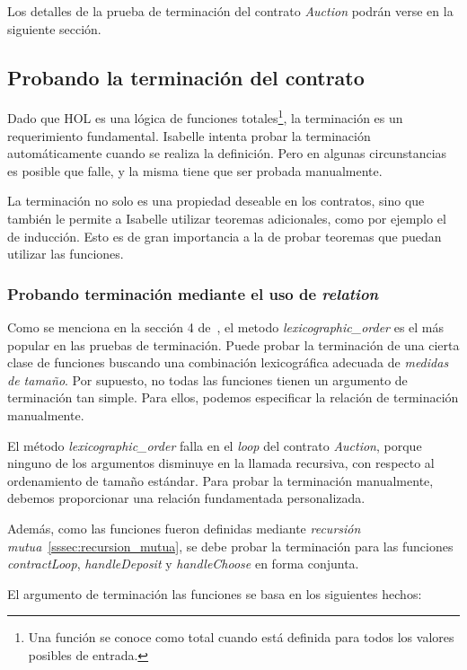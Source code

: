 \documentclass[12pt]{book}
\begin{document}
Los detalles de la prueba de terminación del contrato \textit{Auction} podrán verse en la siguiente sección.


\subsection{Probando la terminación del contrato}

Dado que HOL es una lógica de funciones totales\footnote{Una función se conoce como total cuando está definida para todos los valores posibles de entrada.}, la terminación es un requerimiento fundamental. Isabelle intenta probar la terminación automáticamente cuando se realiza la definición. Pero en algunas circunstancias es posible que falle, y la misma tiene que ser probada manualmente.

La terminación no solo es una propiedad deseable en los contratos, sino que también le permite a Isabelle utilizar teoremas adicionales, como por ejemplo el de inducción. Esto es de gran importancia a la de probar teoremas que puedan utilizar las funciones.

\subsubsection{Probando terminación mediante el uso de \textit{relation}}

Como se menciona en la sección 4 de~\cite{termination-isabelle}, el metodo \textit{lexicographic\_order} es el más popular en las pruebas de terminación. Puede probar la terminación de una cierta clase de funciones buscando una combinación lexicográfica adecuada de \textit{medidas de tamaño}. Por supuesto, no todas las funciones tienen un argumento de terminación tan simple. Para ellos, podemos especificar la relación de terminación manualmente.

El método \textit{lexicographic\_order} falla en el \textit{loop} del contrato \textit{Auction}, porque ninguno de los argumentos disminuye en la llamada recursiva, con respecto al ordenamiento de tamaño estándar. Para probar la terminación manualmente, debemos proporcionar una relación fundamentada personalizada.

Además, como las funciones fueron definidas mediante \textit{recursión mutua}~\ref{sssec:recursion_mutua}, se debe probar la terminación para las funciones \textit{contractLoop}, \textit{handleDeposit} y \textit{handleChoose} en forma conjunta.

El argumento de terminación las funciones se basa en los siguientes hechos:
\end{document}

